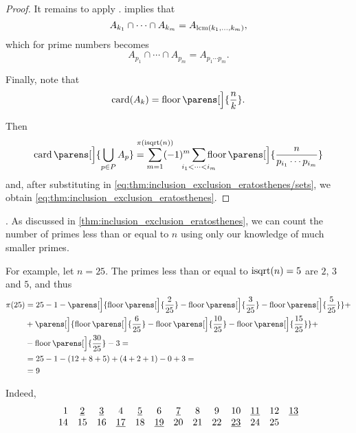 \begin{proof}
  It remains to apply .  implies that
  \begin{equation*}
    A_{k_1} \cap \cdots \cap A_{k_m} = A_{\operatorname{lcm}(k_1, \ldots,k_m)},
  \end{equation*}
  which for prime numbers becomes
  \begin{equation*}
    A_{p_1} \cap \cdots \cap A_{p_m} = A_{p_1 \cdots p_m}.
  \end{equation*}

  Finally, note that
  \begin{equation*}
    \card(A_k) = \floor\parens[\Big]{ \frac n k }.
  \end{equation*}

  Then
  \begin{equation*}
    \card\parens[\Big]{ \bigcup_{p \in P} A_p } = \sum_{m=1}^{\mathclap{\pi(\op{isqrt}(n))}} (-1)^m \sum_{\mathclap{i_1 < \cdots < i_m}} \floor\parens[\Big]{ \frac n {p_{i_1} \cdots p_{i_m}} }
  \end{equation*}
  and, after substituting in \eqref{eq:thm:inclusion_exclusion_eratosthenes/sets}, we obtain \eqref{eq:thm:inclusion_exclusion_eratosthenes}.
\end{proof}

\begin{example}\label{ex:thm:inclusion_exclusion_eratosthenes}.
  As discussed in \cref{thm:inclusion_exclusion_eratosthenes}, we can count the number of primes less than or equal to \( n \) using only our knowledge of much smaller primes.

  For example, let \( n = 25 \). The primes less than or equal to \( \op{isqrt}(n) = 5 \) are \( 2 \), \( 3 \) and \( 5 \), and thus
  \begin{align*}
    \pi(25) &= 25 - 1 - \parens[\Big]{ \floor\parens[\Big]{ \frac 2 {25} } - \floor\parens[\Big]{ \frac 3 {25} } - \floor\parens[\Big]{ \frac 5 {25} } } + \\
            &+ \parens[\Big]{ \floor\parens[\Big]{ \frac 6 {25} } - \floor\parens[\Big]{ \frac {10} {25} } - \floor\parens[\Big]{ \frac {15} {25} } } + \\
            &- \floor\parens[\Big]{ \frac {30} {25} } - 3
            = \\ &= 25 - 1 - (12 + 8 + 5) + (4 + 2 + 1) - 0 + 3
            = \\ &= 9
  \end{align*}

  Indeed,
  \begin{equation*}
    \begin{array}{r *{23}{c}}
      1  & \hi{2} & \hi{3} & 4       & \hi{5} & 6       & \hi{7} & 8  & 9  & 10      & \hi{11} & 12 & \hi{13} \\
      14 & 15     & 16     & \hi{17} & 18     & \hi{19} & 20     & 21 & 22 & \hi{23} & 24      & 25 &
    \end{array}
  \end{equation*}
\end{example}

